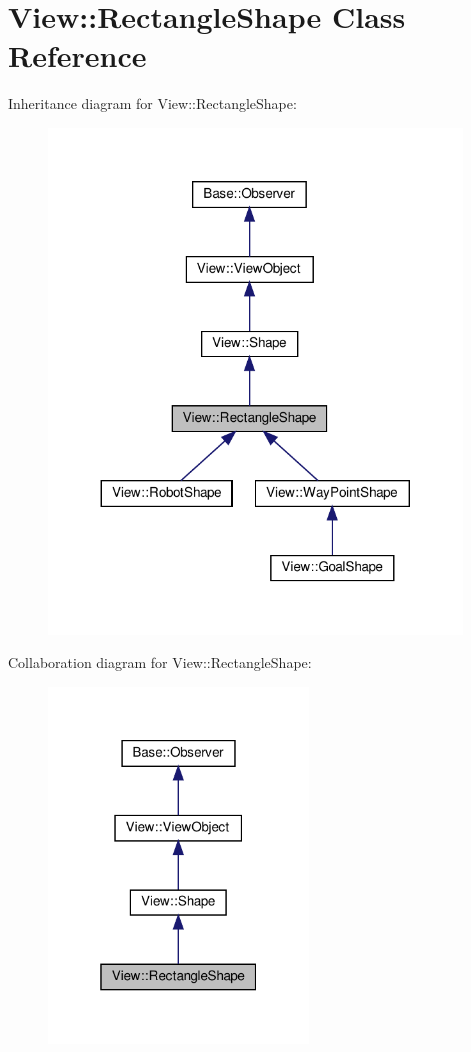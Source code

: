 \hypertarget{class_view_1_1_rectangle_shape}{}\section{View\+:\+:Rectangle\+Shape Class Reference}
\label{class_view_1_1_rectangle_shape}


Inheritance diagram for View\+:\+:Rectangle\+Shape\+:
\nopagebreak
\begin{figure}[H]
\begin{center}
\leavevmode
\includegraphics[width=311pt]{class_view_1_1_rectangle_shape__inherit__graph}
\end{center}
\end{figure}


Collaboration diagram for View\+:\+:Rectangle\+Shape\+:
\nopagebreak
\begin{figure}[H]
\begin{center}
\leavevmode
\includegraphics[width=196pt]{class_view_1_1_rectangle_shape__coll__graph}
\end{center}
\end{figure}
